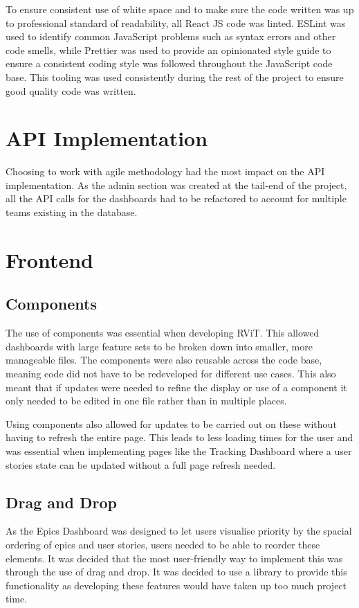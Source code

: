 \documentclass[l4proj.tex]{subfiles}
\begin{document}
 To ensure consistent use of white space and to make sure the code written was up to professional standard of readability, all React JS code was linted. ESLint was used to identify common JavaScript problems such as syntax errors and other code smells, while Prettier was used to provide an opinionated style guide to ensure a consistent coding style was followed throughout the JavaScript code base. This tooling was used consistently during the rest of the project to ensure good quality code was written.


\section{API Implementation}
Choosing to work with agile methodology had the most impact on the API implementation. As the admin section was created at the tail-end of the project, all the API calls for the dashboards had to be refactored to account for multiple teams existing in the database. 

\section{Frontend}

\subsection{Components}
The use of components was essential when developing RViT. This allowed dashboards with large feature sets to be broken down into smaller, more manageable files. The components were also reusable across the code base, meaning code did not have to be redeveloped for different use cases. This also meant that if updates were needed to refine the display or use of a component it only needed to be edited in one file rather than in multiple places. 

Using components also allowed for updates to be carried out on these without having to refresh the entire page. This leads to less loading times for the user and was essential when implementing pages like the Tracking Dashboard where a user stories state can be updated without a full page refresh needed. 

\subsection{Drag and Drop}
As the Epics Dashboard was designed to let users visualise priority by the spacial ordering of epics and user stories, users needed to be able to reorder these elements. It was decided that the most user-friendly way to implement this was through the use of drag and drop. It was decided to use a library to provide this functionality as developing these features would have taken up too much project time. 
\end{document}
